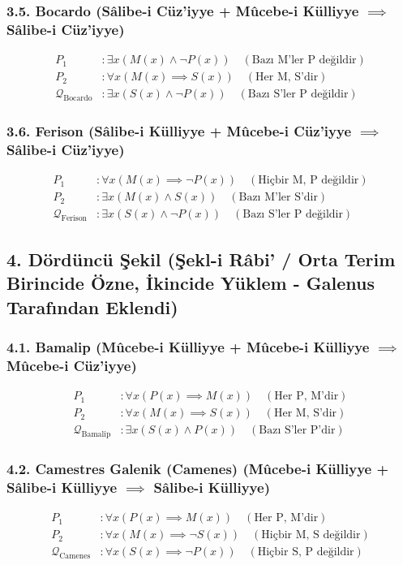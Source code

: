 \documentclass[11pt, a4paper]{article}
\begin{document}
\subsubsection{3.5. Bocardo (Sâlibe-i Cüz'iyye + Mûcebe-i Külliyye $\implies$ Sâlibe-i Cüz'iyye)}
\begin{align}
P_1 &: \exists x (M(x) \land \neg P(x)) \quad (\text{Bazı M'ler P değildir}) \\
P_2 &: \forall x (M(x) \implies S(x)) \quad (\text{Her M, S'dir}) \\
\mathcal{Q}_{\text{Bocardo}} &: \exists x (S(x) \land \neg P(x)) \quad (\text{Bazı S'ler P değildir})
\end{align}

\subsubsection{3.6. Ferison (Sâlibe-i Külliyye + Mûcebe-i Cüz'iyye $\implies$ Sâlibe-i Cüz'iyye)}
\begin{align}
P_1 &: \forall x (M(x) \implies \neg P(x)) \quad (\text{Hiçbir M, P değildir}) \\
P_2 &: \exists x (M(x) \land S(x)) \quad (\text{Bazı M'ler S'dir}) \\
\mathcal{Q}_{\text{Ferison}} &: \exists x (S(x) \land \neg P(x)) \quad (\text{Bazı S'ler P değildir})
\end{align}

\subsection{4. Dördüncü Şekil (Şekl-i Râbi' / Orta Terim Birincide Özne, İkincide Yüklem - Galenus Tarafından Eklendi)}

\subsubsection{4.1. Bamalip (Mûcebe-i Külliyye + Mûcebe-i Külliyye $\implies$ Mûcebe-i Cüz'iyye)}
\begin{align}
P_1 &: \forall x (P(x) \implies M(x)) \quad (\text{Her P, M'dir}) \\
P_2 &: \forall x (M(x) \implies S(x)) \quad (\text{Her M, S'dir}) \\
\mathcal{Q}_{\text{Bamalip}} &: \exists x (S(x) \land P(x)) \quad (\text{Bazı S'ler P'dir})
\end{align}

\subsubsection{4.2. Camestres Galenik (Camenes) (Mûcebe-i Külliyye + Sâlibe-i Külliyye $\implies$ Sâlibe-i Külliyye)}
\begin{align}
P_1 &: \forall x (P(x) \implies M(x)) \quad (\text{Her P, M'dir}) \\
P_2 &: \forall x (M(x) \implies \neg S(x)) \quad (\text{Hiçbir M, S değildir}) \\
\mathcal{Q}_{\text{Camenes}} &: \forall x (S(x) \implies \neg P(x)) \quad (\text{Hiçbir S, P değildir})
\end{align}
\end{document}
